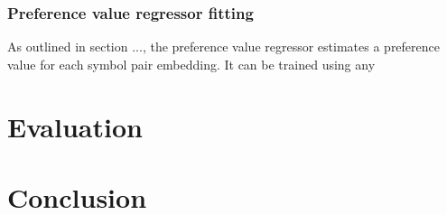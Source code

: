 \subsubsection{Preference value regressor fitting}

As outlined in section ...,
the preference value regressor estimates a preference value for each symbol pair embedding.
It can be trained using any 

\section{Evaluation}
\label{sec:evaluation}

\section{Conclusion}

\glsaddall
\printglossaries





